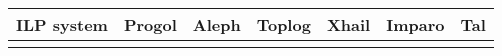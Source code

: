  \begin{tabular}{| l | l | l | l | l | l | l |}
    \hline
    ILP system & Progol & Aleph & Toplog & Xhail & Imparo & Tal \\ \hline
     &  &  &  &  &  &  \\ \hline
    \hline
  \end{tabular}

\begin{minipage}[t]{.60\textwidth}
\begin{lstlisting}
\end{lstlisting}
\end{minipage}
\begin{minipage}[t]{.20\textwidth}
\begin{lstlisting}
\end{lstlisting}
\end{minipage}

